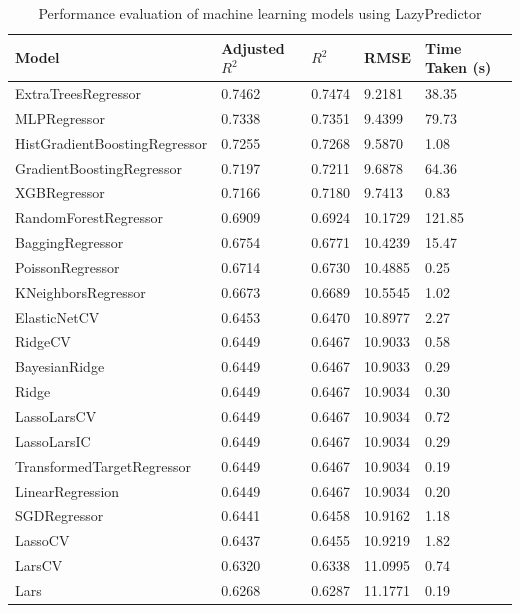 \documentclass[a4paper,12pt]{article}
\begin{document}
\begin{table}[H]
    \centering
    \caption{Performance evaluation of machine learning models using LazyPredictor}
    \label{tab:lazypredictor_results}
    \small %
    \begin{tabular}{lllll}
        \toprule
        \textbf{Model} & {\textbf{Adjusted $R^2$}} & {\textbf{$R^2$}} & {\textbf{RMSE}} & {\textbf{Time Taken (s)}} \\
        \midrule
        ExtraTreesRegressor & 0.7462 & 0.7474 & 9.2181 & 38.35 \\
        MLPRegressor & 0.7338 & 0.7351 & 9.4399 & 79.73 \\
        HistGradientBoostingRegressor & 0.7255 & 0.7268 & 9.5870 & 1.08 \\
        GradientBoostingRegressor & 0.7197 & 0.7211 & 9.6878 & 64.36 \\
        XGBRegressor & 0.7166 & 0.7180 & 9.7413 & 0.83 \\
        RandomForestRegressor & 0.6909 & 0.6924 & 10.1729 & 121.85 \\
        BaggingRegressor & 0.6754 & 0.6771 & 10.4239 & 15.47 \\
        PoissonRegressor & 0.6714 & 0.6730 & 10.4885 & 0.25 \\
        KNeighborsRegressor & 0.6673 & 0.6689 & 10.5545 & 1.02 \\
        ElasticNetCV & 0.6453 & 0.6470 & 10.8977 & 2.27 \\
        RidgeCV & 0.6449 & 0.6467 & 10.9033 & 0.58 \\
        BayesianRidge & 0.6449 & 0.6467 & 10.9033 & 0.29 \\
        Ridge & 0.6449 & 0.6467 & 10.9034 & 0.30 \\
        LassoLarsCV & 0.6449 & 0.6467 & 10.9034 & 0.72 \\
        LassoLarsIC & 0.6449 & 0.6467 & 10.9034 & 0.29 \\
        TransformedTargetRegressor & 0.6449 & 0.6467 & 10.9034 & 0.19 \\
        LinearRegression & 0.6449 & 0.6467 & 10.9034 & 0.20 \\
        SGDRegressor & 0.6441 & 0.6458 & 10.9162 & 1.18 \\
        LassoCV & 0.6437 & 0.6455 & 10.9219 & 1.82 \\
        LarsCV & 0.6320 & 0.6338 & 11.0995 & 0.74 \\
        Lars & 0.6268 & 0.6287 & 11.1771 & 0.19 \\

\end{tabular}
\end{table}
\end{document}
